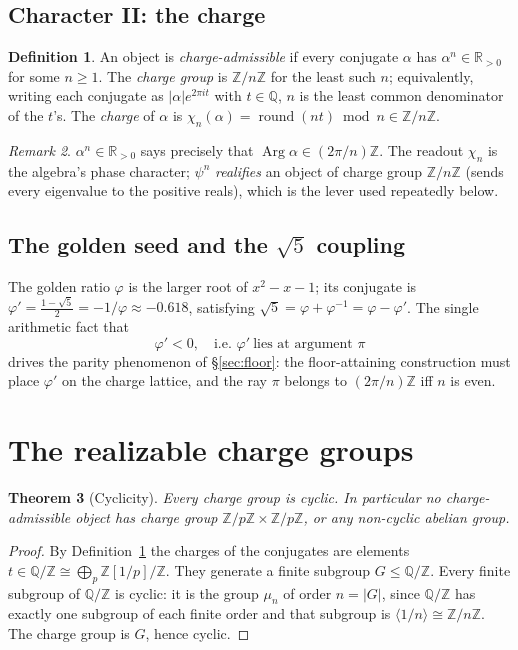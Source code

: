 \documentclass[11pt]{article}
\newtheorem{theorem}{Theorem}[section]
\theoremstyle{definition}
\newtheorem{definition}[theorem]{Definition}
\theoremstyle{remark}
\newtheorem{remark}[theorem]{Remark}
\newcommand{\Z}{\mathbb{Z}}
\newcommand{\Q}{\mathbb{Q}}
\newcommand{\R}{\mathbb{R}}
\newcommand{\Adams}[1]{\psi^{#1}}
\newcommand{\gold}{\varphi}
\newcommand{\Zmod}[1]{\Z/#1\Z}
\DeclareMathOperator{\Arg}{Arg}
\begin{document}
\subsection{Character II: the charge}
\begin{definition}\label{def:charge}
An object is \emph{charge-admissible} if every conjugate $\alpha$ has $\alpha^{n}\in\R_{>0}$
for some $n\ge1$. The \emph{charge group} is $\Zmod n$ for the least such $n$; equivalently,
writing each conjugate as $|\alpha|e^{2\pi i t}$ with $t\in\Q$, $n$ is the least common
denominator of the $t$'s. The \emph{charge} of $\alpha$ is
$\chi_n(\alpha)=\operatorname{round}(nt)\bmod n\in\Zmod n$.
\end{definition}

\begin{remark}
$\alpha^{n}\in\R_{>0}$ says precisely that $\Arg\alpha\in(2\pi/n)\Z$. The readout
$\chi_n$ is the algebra's phase character; $\Adams n$ \emph{realifies} an object of charge
group $\Zmod n$ (sends every eigenvalue to the positive reals), which is the lever used
repeatedly below.
\end{remark}

\subsection{The golden seed and the \texorpdfstring{$\sqrt5$}{sqrt5} coupling}
The golden ratio $\gold$ is the larger root of $x^2-x-1$; its conjugate is
$\gold'=\tfrac{1-\sqrt5}{2}=-1/\gold\approx-0.618$, satisfying
$\sqrt5=\gold+\gold^{-1}=\gold-\gold'$. The single arithmetic fact that
\[
\boxed{\;\gold'<0,\quad\text{i.e.\ }\gold'\ \text{lies at argument }\pi\;}
\]
drives the parity phenomenon of \S\ref{sec:floor}: the floor-attaining construction must
place $\gold'$ on the charge lattice, and the ray $\pi$ belongs to $(2\pi/n)\Z$ iff $n$ is
even.

\section{The realizable charge groups}\label{sec:structure}

\begin{theorem}[Cyclicity]\label{thm:cyclic}
Every charge group is cyclic. In particular no charge-admissible object has charge group
$\Zmod p\times\Zmod p$, or any non-cyclic abelian group.
\end{theorem}
\begin{proof}
By Definition~\ref{def:charge} the charges of the conjugates are elements
$t\in\Q/\Z\cong\bigoplus_{p}\Z[1/p]/\Z$. They generate a finite subgroup
$G\le\Q/\Z$. Every finite subgroup of $\Q/\Z$ is cyclic: it is the group $\mu_n$ of order
$n=|G|$, since $\Q/\Z$ has exactly one subgroup of each finite order and that subgroup is
$\langle 1/n\rangle\cong\Zmod n$. The charge group is $G$, hence cyclic.
\end{proof}
\end{document}
